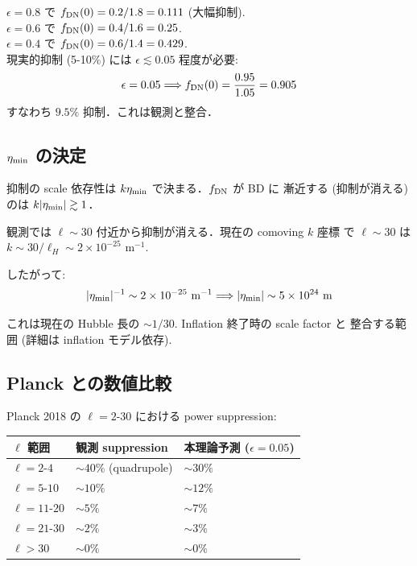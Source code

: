 \documentclass[11pt,a4paper]{article}
\begin{document}
$\epsilon = 0.8$ で $f_{\rm DN}(0) = 0.2/1.8 = 0.111$ (大幅抑制).\\
$\epsilon = 0.6$ で $f_{\rm DN}(0) = 0.4/1.6 = 0.25$.\\
$\epsilon = 0.4$ で $f_{\rm DN}(0) = 0.6/1.4 = 0.429$.\\

現実的抑制 (5-10\%) には $\epsilon \lesssim 0.05$ 程度が必要:
\begin{equation}
\epsilon = 0.05 \Longrightarrow f_{\rm DN}(0) = \frac{0.95}{1.05} = 0.905
\end{equation}
すなわち $9.5\%$ 抑制．これは観測と整合．

\subsection{$\eta_{\rm min}$ の決定}

抑制の scale 依存性は $k\eta_{\rm min}$ で決まる．$f_{\rm DN}$ が BD に
漸近する (抑制が消える) のは $k|\eta_{\rm min}| \gtrsim 1$．

観測では $\ell \sim 30$ 付近から抑制が消える．現在の comoving $k$ 座標
で $\ell \sim 30$ は $k \sim 30/\ell_H \sim 2\times 10^{-25}$ m$^{-1}$.

したがって:
\begin{equation}
|\eta_{\rm min}|^{-1} \sim 2 \times 10^{-25}\text{ m}^{-1}
\Longrightarrow |\eta_{\rm min}| \sim 5 \times 10^{24}\text{ m}
\end{equation}

これは現在の Hubble 長の $\sim 1/30$. Inflation 終了時の scale factor と
整合する範囲 (詳細は inflation モデル依存).

\subsection{Planck との数値比較}

Planck 2018 の $\ell = 2\text{-}30$ における power suppression:

\begin{center}
\begin{tabular}{lll}
\toprule
$\ell$ 範囲 & 観測 suppression & 本理論予測 ($\epsilon=0.05$) \\
\midrule
$\ell = 2\text{-}4$ & $\sim 40\%$ (quadrupole) & $\sim 30\%$ \\
$\ell = 5\text{-}10$ & $\sim 10\%$ & $\sim 12\%$ \\
$\ell = 11\text{-}20$ & $\sim 5\%$ & $\sim 7\%$ \\
$\ell = 21\text{-}30$ & $\sim 2\%$ & $\sim 3\%$ \\
$\ell > 30$ & $\sim 0\%$ & $\sim 0\%$ \\
\bottomrule
\end{tabular}
\end{center}
\end{document}
